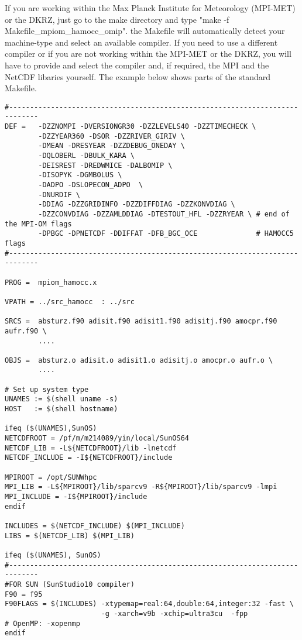 \documentclass[11pt,a4paper,fleqn,twoside]{article}
\begin{document}
If you are working within the Max Planck Institute for Meteorology (MPI-MET) or the DKRZ,
just go to the make directory and type "make -f Makefile\_mpiom\_hamocc\_omip". the Makefile will 
automatically detect your machine-type and select an available compiler.
If you need to use a different compiler or if you are not working within the MPI-MET or the DKRZ,
you will have to provide and select the compiler and, if required, the MPI and the NetCDF libaries yourself.
The example below shows parts of the standard Makefile. 

\begin{footnotesize}
\begin{verbatim}
#-----------------------------------------------------------------------------
DEF =   -DZZNOMPI -DVERSIONGR30 -DZZLEVELS40 -DZZTIMECHECK \
        -DZZYEAR360 -DSOR -DZZRIVER_GIRIV \
        -DMEAN -DRESYEAR -DZZDEBUG_ONEDAY \
        -DQLOBERL -DBULK_KARA \
        -DEISREST -DREDWMICE -DALBOMIP \
        -DISOPYK -DGMBOLUS \
        -DADPO -DSLOPECON_ADPO  \
        -DNURDIF \
        -DDIAG -DZZGRIDINFO -DZZDIFFDIAG -DZZKONVDIAG \
        -DZZCONVDIAG -DZZAMLDDIAG -DTESTOUT_HFL -DZZRYEAR \ # end of the MPI-OM flags
        -DPBGC -DPNETCDF -DDIFFAT -DFB_BGC_OCE              # HAMOCC5 flags
#-----------------------------------------------------------------------------

PROG =	mpiom_hamocc.x

VPATH = ../src_hamocc  : ../src

SRCS =	absturz.f90 adisit.f90 adisit1.f90 adisitj.f90 amocpr.f90 aufr.f90 \
        ....

OBJS =	absturz.o adisit.o adisit1.o adisitj.o amocpr.o aufr.o \
        ....

# Set up system type
UNAMES := $(shell uname -s)
HOST   := $(shell hostname)

ifeq ($(UNAMES),SunOS)
NETCDFROOT = /pf/m/m214089/yin/local/SunOS64
NETCDF_LIB = -L${NETCDFROOT}/lib -lnetcdf
NETCDF_INCLUDE = -I${NETCDFROOT}/include

MPIROOT = /opt/SUNWhpc
MPI_LIB = -L${MPIROOT}/lib/sparcv9 -R${MPIROOT}/lib/sparcv9 -lmpi
MPI_INCLUDE = -I${MPIROOT}/include
endif

INCLUDES = $(NETCDF_INCLUDE) $(MPI_INCLUDE)
LIBS = $(NETCDF_LIB) $(MPI_LIB)

ifeq ($(UNAMES), SunOS)
#-----------------------------------------------------------------------------
#FOR SUN (SunStudio10 compiler)
F90 = f95
F90FLAGS = $(INCLUDES) -xtypemap=real:64,double:64,integer:32 -fast \
                       -g -xarch=v9b -xchip=ultra3cu  -fpp 
# OpenMP: -xopenmp
endif


\end{verbatim}
\end{footnotesize}
\end{document}
